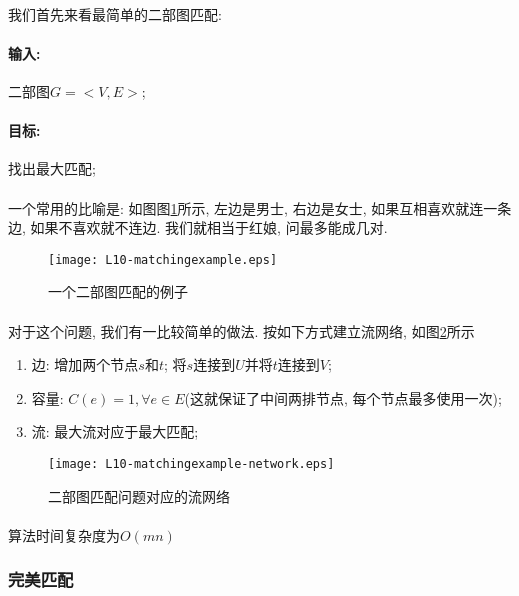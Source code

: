 \documentclass[a4paper]{article}
\renewcommand{\figurename}{图}
\begin{document}
        \paragraph{}我们首先来看最简单的二部图匹配:
        \paragraph{输入:} 二部图$G=<V,E>$;
        \paragraph{目标: } 找出最大匹配;
        \paragraph{}一个常用的比喻是: 如图\figurename\ref{Figure: matching_example}所示, 左边是男士, 右边是女士, 如果互相喜欢就连一条边, 如果不喜欢就不连边. 我们就相当于红娘, 问最多能成几对.
    \begin{figure}[h]
        \centering
        \texttt{[image: L10-matchingexample.eps]}
        \caption{一个二部图匹配的例子}
        \label{Figure: matching_example}
    \end{figure}
    \paragraph{}对于这个问题, 我们有一比较简单的做法. 按如下方式建立流网络, 如\figurename\ref{Figure: matching_example_network}所示
    \begin{enumerate}
\item 边: 增加两个节点$s$和$t$; 将$s$连接到$U$并将$t$连接到$V$;
\item 容量: $C(e)=1, \forall e\in E$(这就保证了中间两排节点, 每个节点最多使用一次);
\item 流: 最大流对应于最大匹配;
\end{enumerate}
    \begin{figure}[h]
        \centering
        \texttt{[image: L10-matchingexample-network.eps]}
        \caption{二部图匹配问题对应的流网络}
        \label{Figure: matching_example_network}
    \end{figure}
    \paragraph{}算法时间复杂度为$O(mn)$
        \subsubsection{完美匹配}
\end{document}
